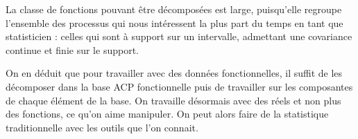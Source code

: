 \begin{rem}
	La classe de fonctions pouvant être décomposées est large, puisqu'elle regroupe l'ensemble des processus qui nous intéressent la plus part du temps en tant que statisticien : celles qui sont à support sur un intervalle, admettant une covariance continue et finie sur le support.
\end{rem}

On en déduit que pour travailler avec des données fonctionnelles, il suffit de les décomposer dans la base ACP fonctionnelle puis de travailler sur les composantes de chaque élément de la base. On travaille désormais avec des réels et non plus des fonctions, ce qu'on aime manipuler. On peut alors faire de la statistique traditionnelle avec les outils que l'on connait.


\begin{propriete*}
	\noindent{}
\end{propriete*}

